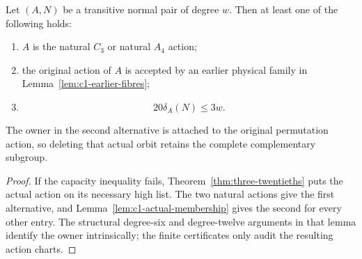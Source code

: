 \begin{corollary}
\label{cor:c1-owner-or-capacity}
Let $(A,N)$ be a transitive normal pair of degree $w$.  Then at least
one of the following holds:
\begin{enumerate}
\item $A$ is the natural $C_3$ or natural $A_4$ action;
\item the original action of $A$ is accepted by an earlier physical
  family in Lemma~\ref{lem:c1-earlier-fibres};
\item
\[
  20\delta_A(N)\leq3w.
\]
\end{enumerate}
The owner in the second alternative is attached to the original
permutation action, so deleting that actual orbit retains the complete
complementary subgroup.
\end{corollary}
\begin{proof}
If the capacity inequality fails, Theorem~\ref{thm:three-twentieths}
puts the actual action on its necessary high list.  The two natural
actions give the first alternative, and
Lemma~\ref{lem:c1-actual-membership} gives the second for every other
entry.  The structural degree-six and degree-twelve arguments in that
lemma identify the owner intrinsically; the finite certificates only
audit the resulting action charts.
\end{proof}

